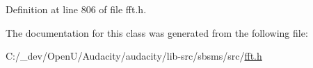 Definition at line 806 of file fft.\+h.



The documentation for this class was generated from the following file\+:\begin{DoxyCompactItemize}
\item 
C\+:/\+\_\+dev/\+Open\+U/\+Audacity/audacity/lib-\/src/sbsms/src/\hyperlink{lib-src_2sbsms_2src_2fft_8h}{fft.\+h}\end{DoxyCompactItemize}

